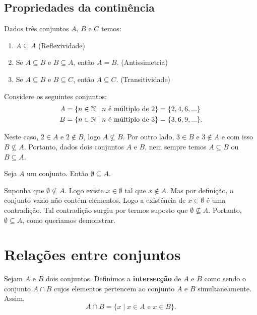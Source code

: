 \subsection{Propriedades da contin{\^e}ncia}
Dados três conjuntos $A$, $B$ e $C$ temos:
\begin{enumerate}
\item $A\subseteq A$ (Reflexividade)
\item Se $A\subseteq B \mbox{ e } B\subseteq A$, ent{\~a}o $A=B$. (Antissimetria)
\item Se $A\subseteq B$ e $B\subseteq C$, ent{\~a}o $A\subseteq C$. (Transitividade)
\end{enumerate}

Considere os seguintes conjuntos:
\begin{align*}
	A &= \{ n \in \mathbb{N} \mid n \mbox{ {\'e} m{\'u}ltiplo de } 2\} = \{2,4,6,...\}\\
	B &= \{n \in \mathbb{N} \mid n \mbox{ {\'e} m{\'u}ltiplo de } 3\} = \{3,6,9,...\}.
\end{align*}


Neste caso, $2 \in A$ e $2 \notin B$, logo $A \nsubseteq B$. Por outro lado, $3 \in B$ e $3 \notin A$ e com isso $B \nsubseteq A$. Portanto, dados dois conjuntos $A$ e $B$, nem sempre temos $A \subseteq B$ ou $B \subseteq A$.

\begin{proposicao} 
	Seja $A$ um conjunto. Ent{\~a}o $ \emptyset \subseteq A$.
\end{proposicao}
\begin{prova}
	Suponha que $\emptyset \nsubseteq A$. Logo existe $x \in \emptyset$ tal que $x \notin A$. Mas por defini{\c c}{\~a}o, o conjunto vazio n{\~a}o cont{\'e}m elementos. Logo a exist\^encia de $x \in \emptyset$ {\'e} uma contradi{\c c}{\~a}o. Tal contradi\c{c}\~ao surgiu por termos suposto que $\emptyset \nsubseteq A$. Portanto, $\emptyset \subseteq A$, como quer{\'\i}amos demonstrar.
\end{prova}

\section{Rela{\c c}{\~o}es entre conjuntos}

\begin{definicao}[Intersec{\c c}{\~a}o]\label{intersecao_conjunto}
Sejam $A$ e $B$ dois conjuntos. Definimos a \textbf{intersec{\c c}{\~a}o} de $A$ e $B$ como sendo o conjunto $A \cap B$ cujos elementos pertencem ao conjunto $A$ e $B$ simultaneamente. Assim,
\[
A \cap B = \{x \mid x \in A\mbox{ e }  x \in B\}.
\]
\end{definicao}

